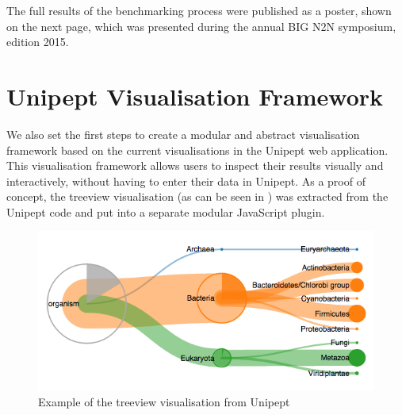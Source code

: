 \documentclass[twocolumn]{phdsymp}
\begin{document}
The full results of the benchmarking process were published as a poster, shown
on the next page, which was presented during the annual BIG N2N symposium,
edition 2015\cite{BIGN3:online}.

\section{Unipept Visualisation Framework} 

We also set the first steps to create a modular and abstract visualisation
framework based on the current visualisations in the Unipept web application.
This visualisation framework allows users to inspect their results visually
and interactively, without having to enter their data in Unipept. As a proof of
concept, the treeview visualisation (as can be seen in )
was extracted from the Unipept code and put into a separate modular JavaScript
plugin.

\begin{figure}[hbt]
	\centering 
	\includegraphics[width=0.8\columnwidth]{includes/treeviewarc}
	\caption{Example of the treeview visualisation from Unipept}
	\label{fig:treeviewarc}
\end{figure}
\end{document}
